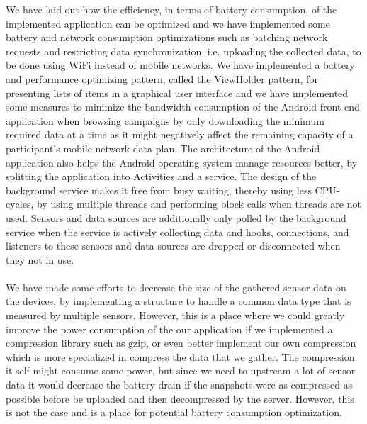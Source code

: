 We have laid out how the efficiency, in terms of battery consumption, of the implemented application can be optimized and we have implemented some battery and network consumption optimizations such as batching network requests and restricting data synchronization, i.e. uploading the collected data, to be done using WiFi instead of mobile networks. We have implemented a battery and performance optimizing pattern, called the ViewHolder pattern, for presenting lists of items in a graphical user interface and we have implemented some measures to minimize the bandwidth consumption of the Android front-end application when browsing campaigns by only downloading the minimum required data at a time as it might negatively affect the remaining capacity of a participant's mobile network data plan. The architecture of the Android application also helps the Android operating system manage resources better, by splitting the application into Activities and a service. The design of the background service makes it free from busy waiting, thereby using less CPU-cycles, by using multiple threads and performing block calls when threads are not used. Sensors and data sources are additionally only polled by the background service when the service is actively collecting data and hooks, connections, and listeners to these sensors and data sources are dropped or disconnected when they not in use. 
\\\\
We have made some efforts to decrease the size of the gathered sensor data on the devices, by implementing a structure to handle a common data type that is measured by multiple sensors. However, this is a place where we could greatly improve the power consumption of the our application if we implemented a compression library such as gzip, or even better implement our own compression which is more specialized in compress the data that we gather. The compression it self might consume some power, but since we need to upstream a lot of sensor data it would decrease the battery drain if the snapshots were as compressed as possible before be uploaded and then decompressed by the server. However, this is not the case and is a place for potential battery consumption optimization.

